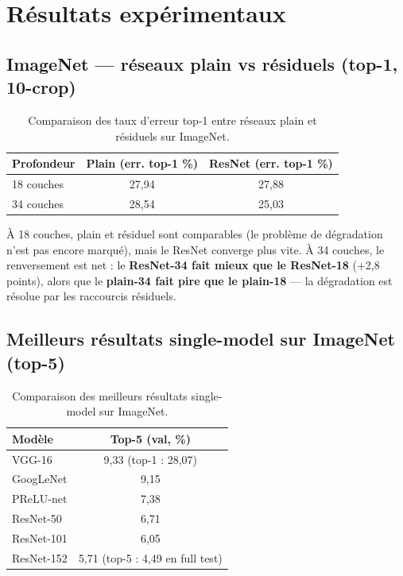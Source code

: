 \documentclass[a4paper,11pt]{article}
\begin{document}
\section{Résultats expérimentaux}

\subsection{ImageNet --- réseaux plain vs résiduels (top-1, 10-crop)}

\begin{table}[H]
\centering
\begin{tabular}{lcc}
\toprule
\textbf{Profondeur} & \textbf{Plain (err. top-1 \%)} & \textbf{ResNet (err. top-1 \%)} \\
\midrule
18 couches & 27,94 & 27,88 \\
34 couches & 28,54 & 25,03 \\
\bottomrule
\end{tabular}
\caption{Comparaison des taux d'erreur top-1 entre réseaux plain et résiduels sur ImageNet.}
\end{table}

À 18 couches, plain et résiduel sont comparables (le problème de dégradation n'est pas encore marqué), mais le ResNet converge plus vite. À 34 couches, le renversement est net : le \textbf{ResNet-34 fait mieux que le ResNet-18} (+2,8 points), alors que le \textbf{plain-34 fait pire que le plain-18} --- la dégradation est résolue par les raccourcis résiduels.

\subsection{Meilleurs résultats single-model sur ImageNet (top-5)}

\begin{table}[H]
\centering
\begin{tabular}{lc}
\toprule
\textbf{Modèle} & \textbf{Top-5 (val, \%)} \\
\midrule
VGG-16 & 9,33 (top-1 : 28,07) \\
GoogLeNet & 9,15 \\
PReLU-net & 7,38 \\
ResNet-50 & 6,71 \\
ResNet-101 & 6,05 \\
ResNet-152 & 5,71 (top-5 : 4,49 en full test) \\
\bottomrule
\end{tabular}
\caption{Comparaison des meilleurs résultats single-model sur ImageNet.}
\end{table}
\end{document}
